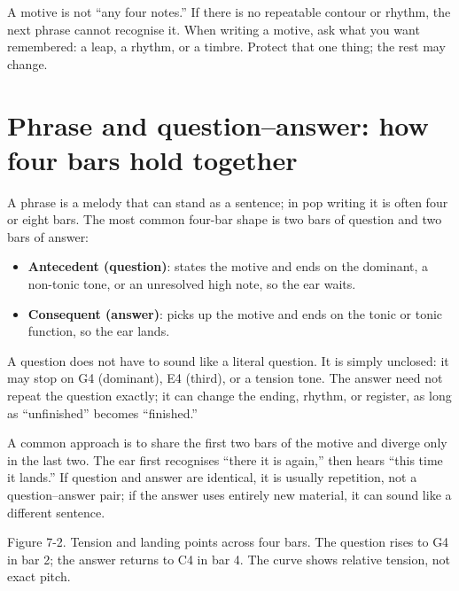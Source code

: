 A motive is not ``any four notes.'' If there is no repeatable contour or rhythm, the next phrase cannot recognise it. When writing a motive, ask what you want remembered: a leap, a rhythm, or a timbre. Protect that one thing; the rest may change.

\section{Phrase and question--answer: how four bars hold together}

A phrase is a melody that can stand as a sentence; in pop writing it is often four or eight bars. The most common four-bar shape is two bars of question and two bars of answer:

\begin{itemize}
  \item \textbf{Antecedent (question)}: states the motive and ends on the dominant, a non-tonic tone, or an unresolved high note, so the ear waits.
  \item \textbf{Consequent (answer)}: picks up the motive and ends on the tonic or tonic function, so the ear lands.
\end{itemize}

A question does not have to sound like a literal question. It is simply unclosed: it may stop on G4 (dominant), E4 (third), or a tension tone. The answer need not repeat the question exactly; it can change the ending, rhythm, or register, as long as ``unfinished'' becomes ``finished.''

A common approach is to share the first two bars of the motive and diverge only in the last two. The ear first recognises ``there it is again,'' then hears ``this time it lands.'' If question and answer are identical, it is usually repetition, not a question--answer pair; if the answer uses entirely new material, it can sound like a different sentence.


\begin{center}
\begin{minipage}{0.92\linewidth}
\centering
{}

Figure 7-2. Tension and landing points across four bars. The question rises to G4 in bar 2; the answer returns to C4 in bar 4. The curve shows relative tension, not exact pitch.
\end{minipage}
\end{center}

